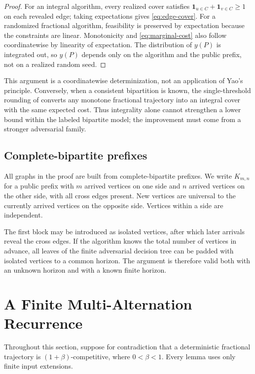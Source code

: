 \documentclass[11pt,letterpaper]{article}
\newcommand{\cref}[1]{\autoref{#1}}
\theoremstyle{definition}
\theoremstyle{remark}
\begin{document}
\begin{proof}
For an integral algorithm, every realized cover satisfies $\mathbf 1_{{u\in C}}+\mathbf 1_{{v\in C}}\ge1$ on each revealed edge; taking expectations gives \cref{eq:edge-cover}.
For a randomized fractional algorithm, feasibility is preserved by expectation because the constraints are linear.
Monotonicity and \cref{eq:marginal-cost} also follow coordinatewise by linearity of expectation.
The distribution of $y(P)$ is integrated out, so $y(P)$ depends only on the algorithm and the public prefix, not on a realized random seed.
\end{proof}

This argument is a coordinatewise determinization, not an application of Yao's principle.
Conversely, when a consistent bipartition is known, the single-threshold rounding of \citet{WangWong2015} converts any monotone fractional trajectory into an integral cover with the same expected cost.
Thus integrality alone cannot strengthen a lower bound within the labeled bipartite model; the improvement must come from a stronger adversarial family.

\subsection{Complete-bipartite prefixes}

All graphs in the proof are built from complete-bipartite prefixes.
We write $K_{m,n}$ for a public prefix with $m$ arrived vertices on one side and $n$ arrived vertices on the other side, with all cross edges present.
New vertices are universal to the currently arrived vertices on the opposite side.
Vertices within a side are independent.

The first block may be introduced as isolated vertices, after which later arrivals reveal the cross edges.
If the algorithm knows the total number of vertices in advance, all leaves of the finite adversarial decision tree can be padded with isolated vertices to a common horizon.
The argument is therefore valid both with an unknown horizon and with a known finite horizon.

\section{A Finite Multi-Alternation Recurrence}\label{sec:finite-recurrence}

Throughout this section, suppose for contradiction that a deterministic fractional trajectory is $(1+\beta)$-competitive, where $0<\beta<1$.
Every lemma uses only finite input extensions.
\end{document}
